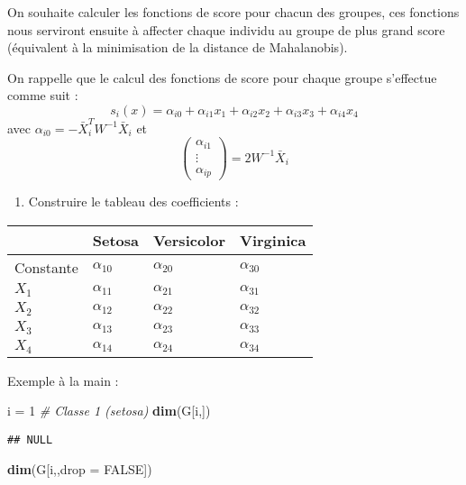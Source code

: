 \documentclass[
]{article}
\newenvironment{Shaded}{\begin{snugshade}}{\end{snugshade}}
\newcommand{\CommentTok}[1]{\textcolor[rgb]{0.56,0.35,0.01}{\textit{#1}}}
\newcommand{\DataTypeTok}[1]{\textcolor[rgb]{0.13,0.29,0.53}{#1}}
\newcommand{\DecValTok}[1]{\textcolor[rgb]{0.00,0.00,0.81}{#1}}
\newcommand{\KeywordTok}[1]{\textcolor[rgb]{0.13,0.29,0.53}{\textbf{#1}}}
\newcommand{\NormalTok}[1]{#1}
\newcommand{\OtherTok}[1]{\textcolor[rgb]{0.56,0.35,0.01}{#1}}
\newcommand{\StringTok}[1]{\textcolor[rgb]{0.31,0.60,0.02}{#1}}
\providecommand{\tightlist}{%
  \setlength{\itemsep}{0pt}\setlength{\parskip}{0pt}}
\begin{document}
On souhaite calculer les fonctions de score pour chacun des groupes, ces
fonctions nous serviront ensuite à affecter chaque individu au groupe de
plus grand score (équivalent à la minimisation de la distance de
Mahalanobis).

On rappelle que le calcul des fonctions de score pour chaque groupe
s'effectue comme suit : \[
s_i(x) = \alpha_{i0} + \alpha_{i1}x_1 + \alpha_{i2}x_2 + \alpha_{i3}x_3 + \alpha_{i4}x_4 
\] avec \(\alpha_{i0} = - \bar{X}_i^T W^{-1} \bar{X}_i\) et \[
\begin{pmatrix} \alpha_{i1} \\ \vdots \\ \alpha_{ip} \end{pmatrix} = 2 W^{-1} \bar{X}_i
\]

\begin{enumerate}
\def\labelenumi{\arabic{enumi}.}
\setcounter{enumi}{21}
\tightlist
\item
  Construire le tableau des coefficients :
\end{enumerate}

\begin{longtable}[]{@{}llll@{}}
\toprule
& Setosa & Versicolor & Virginica\tabularnewline
\midrule
\endhead
Constante & \(\alpha_{10}\) & \(\alpha_{20}\) &
\(\alpha_{30}\)\tabularnewline
\(X_1\) & \(\alpha_{11}\) & \(\alpha_{21}\) &
\(\alpha_{31}\)\tabularnewline
\(X_2\) & \(\alpha_{12}\) & \(\alpha_{22}\) &
\(\alpha_{32}\)\tabularnewline
\(X_3\) & \(\alpha_{13}\) & \(\alpha_{23}\) &
\(\alpha_{33}\)\tabularnewline
\(X_4\) & \(\alpha_{14}\) & \(\alpha_{24}\) &
\(\alpha_{34}\)\tabularnewline
\bottomrule
\end{longtable}

Exemple à la main :

\begin{Shaded}
\begin{Highlighting}[]
\NormalTok{i =}\StringTok{ }\DecValTok{1} \CommentTok{# Classe 1 (setosa)}
\KeywordTok{dim}\NormalTok{(G[i,])}
\end{Highlighting}
\end{Shaded}

\begin{verbatim}
## NULL
\end{verbatim}

\begin{Shaded}
\begin{Highlighting}[]
\KeywordTok{dim}\NormalTok{(G[i,,}\DataTypeTok{drop =} \OtherTok{FALSE}\NormalTok{])}
\end{Highlighting}
\end{Shaded}
\end{document}
